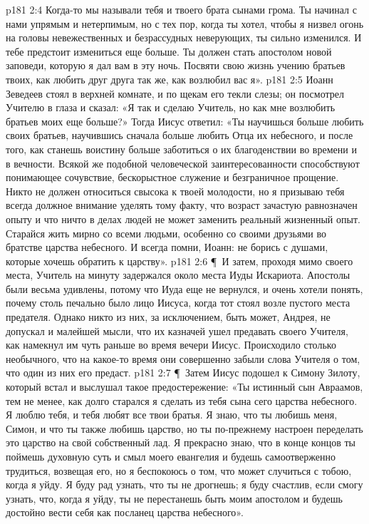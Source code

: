 \vs p181 2:4 Когда\hyp{}то мы называли тебя и твоего брата сынами грома. Ты начинал с нами упрямым и нетерпимым, но с тех пор, когда ты хотел, чтобы я низвел огонь на головы невежественных и безрассудных неверующих, ты сильно изменился. И тебе предстоит измениться еще больше. Ты должен стать апостолом новой заповеди, которую я дал вам в эту ночь. Посвяти свою жизнь учению братьев твоих, как любить друг друга так же, как возлюбил вас я».
\vs p181 2:5 Иоанн Зеведеев стоял в верхней комнате, и по щекам его текли слезы; он посмотрел Учителю в глаза и сказал: «Я так и сделаю Учитель, но как мне возлюбить братьев моих еще больше?» Тогда Иисус ответил: «Ты научишься больше любить своих братьев, научившись сначала больше любить Отца их небесного, и после того, как станешь воистину больше заботиться о их благоденствии во времени и в вечности. Всякой же подобной человеческой заинтересованности способствуют понимающее сочувствие, бескорыстное служение и безграничное прощение. Никто не должен относиться свысока к твоей молодости, но я призываю тебя всегда должное внимание уделять тому факту, что возраст зачастую равнозначен опыту и что ничто в делах людей не может заменить реальный жизненный опыт. Старайся жить мирно со всеми людьми, особенно со своими друзьями во братстве царства небесного. И всегда помни, Иоанн: не борись с душами, которые хочешь обратить к царству».
\vs p181 2:6 \P\ И затем, проходя мимо своего места, Учитель на минуту задержался около места Иуды Искариота. Апостолы были весьма удивлены, потому что Иуда еще не вернулся, и очень хотели понять, почему столь печально было лицо Иисуса, когда тот стоял возле пустого места предателя. Однако никто из них, за исключением, быть может, Андрея, не допускал и малейшей мысли, что их казначей ушел предавать своего Учителя, как намекнул им чуть раньше во время вечери Иисус. Происходило столько необычного, что на какое\hyp{}то время они совершенно забыли слова Учителя о том, что один из них его предаст.
\vs p181 2:7 \P\ Затем Иисус подошел к Симону Зилоту, который встал и выслушал такое предостережение: «Ты истинный сын Авраамов, тем не менее, как долго старался я сделать из тебя сына сего царства небесного. Я люблю тебя, и тебя любят все твои братья. Я знаю, что ты любишь меня, Симон, и что ты также любишь царство, но ты по\hyp{}прежнему настроен переделать это царство на свой собственный лад. Я прекрасно знаю, что в конце концов ты поймешь духовную суть и смыл моего евангелия и будешь самоотверженно трудиться, возвещая его, но я беспокоюсь о том, что может случиться с тобою, когда я уйду. Я буду рад узнать, что ты не дрогнешь; я буду счастлив, если смогу узнать, что, когда я уйду, ты не перестанешь быть моим апостолом и будешь достойно вести себя как посланец царства небесного».
